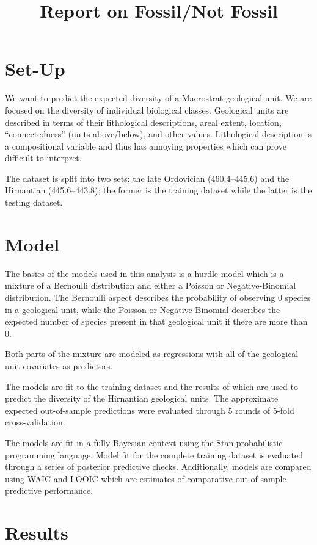\documentclass[12pt,letterpaper]{article}
\title{Report on Fossil/Not Fossil}
\begin{document}
\maketitle

\section{Set-Up}

We want to predict the expected diversity of a Macrostrat geological unit. We are focused on the diversity of individual biological classes. Geological units are described in terms of their lithological descriptions, areal extent, location, ``connectedness'' (units above/below), and other values. Lithological description is a compositional variable and thus has annoying properties which can prove difficult to interpret. 

The dataset is split into two sets: the late Ordovician (460.4--445.6) and the Hirnantian (445.6--443.8); the former is the training dataset while the latter is the testing dataset.


\section{Model}

The basics of the models used in this analysis is a hurdle model which is a mixture of a Bernoulli distribution and either a Poisson or Negative-Binomial distribution. The Bernoulli aspect describes the probability of observing 0 species in a geological unit, while the Poisson or Negative-Binomial describes the expected number of species present in that geological unit if there are more than 0.

Both parts of the mixture are modeled as regressions with all of the geological unit covariates as predictors.

The models are fit to the training dataset and the results of which are used to predict the diversity of the Hirnantian geological units. The approximate expected out-of-sample predictions were evaluated through 5 rounds of 5-fold cross-validation.

The models are fit in a fully Bayesian context using the Stan probabilistic programming language. Model fit for the complete training dataset is evaluated through a series of posterior predictive checks. Additionally, models are compared using WAIC and LOOIC which are estimates of comparative out-of-sample predictive performance.


\section{Results}
\end{document}
